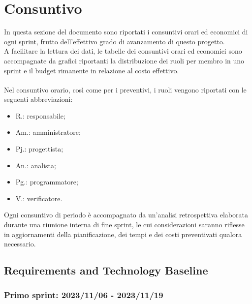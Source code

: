 \chapter{Consuntivo}\label{chap:consuntivo}
In questa sezione del documento sono riportati i consuntivi orari ed economici di ogni sprint, frutto dell'effettivo grado di avanzamento di questo progetto.\\
A facilitare la lettura dei dati, le tabelle dei consuntivi orari ed economici sono accompagnate da grafici riportanti la distribuzione dei ruoli per membro in uno sprint e il budget rimanente in relazione al costo effettivo.\\ \\
Nel consuntivo orario, così come per i preventivi, i ruoli vengono riportati con le seguenti abbreviazioni:
\begin{itemize}
    \item R.: responsabile;
    \item Am.: amministratore;
    \item Pj.: progettista;
    \item An.: analista;
    \item Pg.: programmatore;
    \item V.: verificatore.
\end{itemize}
Ogni consuntivo di periodo è accompagnato da un'analisi retrospettiva elaborata durante una riunione interna di fine sprint, le cui considerazioni saranno riflesse in aggiornamenti della pianificazione, dei tempi e dei costi preventivati qualora necessario.
\newpage

\section{Requirements and Technology Baseline}
\subsection{Primo sprint: 2023/11/06 - 2023/11/19}
